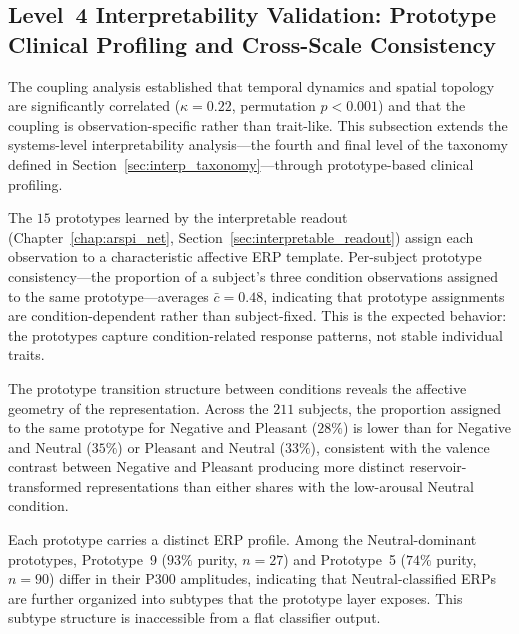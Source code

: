 \subsection{Level~4 Interpretability Validation: Prototype Clinical Profiling and Cross-Scale Consistency}
\label{sec:ch7_level4}

The coupling analysis established that temporal dynamics and spatial topology are significantly correlated ($\kappa = 0.22$, permutation $p < 0.001$) and that the coupling is observation-specific rather than trait-like. This subsection extends the systems-level interpretability analysis---the fourth and final level of the taxonomy defined in Section~\ref{sec:interp_taxonomy}---through prototype-based clinical profiling.

The $15$ prototypes learned by the interpretable readout (Chapter~\ref{chap:arspi_net}, Section~\ref{sec:interpretable_readout}) assign each observation to a characteristic affective ERP template. Per-subject prototype consistency---the proportion of a subject's three condition observations assigned to the same prototype---averages $\bar{c} = 0.48$, indicating that prototype assignments are condition-dependent rather than subject-fixed. This is the expected behavior: the prototypes capture condition-related response patterns, not stable individual traits.

The prototype transition structure between conditions reveals the affective geometry of the representation. Across the $211$ subjects, the proportion assigned to the same prototype for Negative and Pleasant ($28\%$) is lower than for Negative and Neutral ($35\%$) or Pleasant and Neutral ($33\%$), consistent with the valence contrast between Negative and Pleasant producing more distinct reservoir-transformed representations than either shares with the low-arousal Neutral condition.

Each prototype carries a distinct ERP profile. Among the Neutral-dominant prototypes, Prototype~9 ($93\%$ purity, $n = 27$) and Prototype~5 ($74\%$ purity, $n = 90$) differ in their P300 amplitudes, indicating that Neutral-classified ERPs are further organized into subtypes that the prototype layer exposes. This subtype structure is inaccessible from a flat classifier output.

